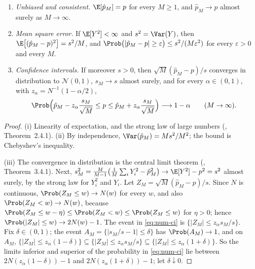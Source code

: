 \begin{theorem}\label{thm:num-mc}
\leavevmode
\begin{enumerate}[label=(\roman*)]
  \item \emph{Unbiased and consistent.} $\E[\hat p_M]=p$ for every $M\ge1$, and $\hat p_M\to p$
    almost surely as $M\to\infty$.
  \item \emph{Mean square error.} If $\E[Y^2]<\infty$ and $s^2=\Var(Y)$, then
    $\E\big[(\hat p_M-p)^2\big]=s^2/M$, and $\Prob\big(|\hat p_M-p|\ge\varepsilon\big)\le s^2/(M\varepsilon^2)$
    for every $\varepsilon>0$ and every $M$.
  \item \emph{Confidence intervals.} If moreover $s>0$, then
    $\sqrt M(\hat p_M-p)/s$ converges in distribution to $\mathcal N(0,1)$, $s_M\to s$ almost
    surely, and for every $\alpha\in(0,1)$, with $z_\alpha=N^{-1}(1-\alpha/2)$,
    \begin{equation}\label{eq:num-ci}
      \Prob\Big(\hat p_M-z_\alpha\frac{s_M}{\sqrt M}\le p\le\hat p_M+z_\alpha\frac{s_M}{\sqrt M}\Big)
      \longrightarrow1-\alpha\qquad(M\to\infty).
    \end{equation}
\end{enumerate}
\end{theorem}

\begin{proof}
(i) Linearity of expectation, and the strong law of large numbers (\textcite{durrett},
Theorem~2.4.1). (ii) By independence, $\Var(\hat p_M)=Ms^2/M^2$; the bound is Chebyshev's inequality.

(iii) The convergence in distribution is the central limit theorem (\textcite{durrett},
Theorem~3.4.1). Next, $s_M^2=\frac M{M-1}\big(\frac1M\sum_iY_i^2-\hat p_M^2\big)\to\E[Y^2]-p^2=s^2$ almost
surely, by the strong law for $Y_i^2$ and $Y_i$. Let $Z_M=\sqrt M(\hat p_M-p)/s$. Since $N$ is
continuous, $\Prob(Z_M\le w)\to N(w)$ for every $w$, and also $\Prob(Z_M<w)\to N(w)$, because
$\Prob(Z_M\le w-\eta)\le\Prob(Z_M<w)\le\Prob(Z_M\le w)$ for $\eta>0$; hence $\Prob(|Z_M|\le w)\to2N(w)-1$. The
event in \eqref{eq:num-ci} is $\{|Z_M|\le z_\alpha s_M/s\}$. Fix $\delta\in(0,1)$; the event
$A_M=\{|s_M/s-1|\le\delta\}$ has $\Prob(A_M)\to1$, and on $A_M$,
$\{|Z_M|\le z_\alpha(1-\delta)\}\subseteq\{|Z_M|\le z_\alpha s_M/s\}\subseteq\{|Z_M|\le z_\alpha(1+\delta)\}$. So the
limits inferior and superior of the probability in \eqref{eq:num-ci} lie between
$2N(z_\alpha(1-\delta))-1$ and $2N(z_\alpha(1+\delta))-1$; let $\delta\downarrow0$.
\end{proof}

